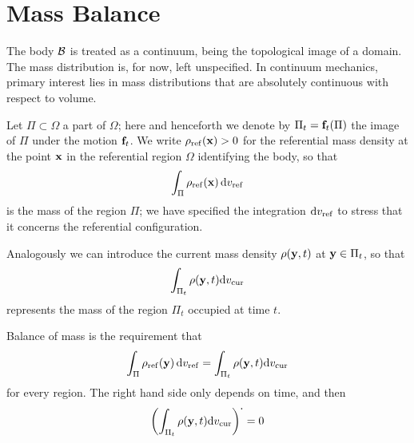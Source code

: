 \chapter{Mass Balance}

The body $\mathcal{B}$ is treated as a continuum, being the topological image of a domain. The mass distribution is, for now, left unspecified. In continuum mechanics, primary interest lies in mass distributions that are absolutely continuous with respect to volume.

Let $\Pi\subset\Omega$ a part of $\Omega$; here and henceforth we denote by $\Pi_t=\mathbf{f}_t(\Pi)$ the image of $\Pi$ under the motion $\mathbf{f}_t$. We write $\rho_{\rm ref}(\mathbf{x})>0$ for the referential mass density at the  point $\mathbf{x}$  in the referential region $\Omega$ identifying the body, so that
\begin{equation}
	\int_{\Pi}\rho_{\rm ref}(\mathbf{x})\,\mathrm{d} v_{\rm ref}
\end{equation}
is the mass of the region $\Pi$; we have specified the integration $\mathrm{d} v_{\rm ref}$ to stress that it concerns the referential configuration.

Analogously we can introduce the current mass density $\rho(\mathbf{y},t)$ at $\mathbf{y}\in\Pi_t$, so that
\begin{equation}
	\int_{\Pi_t}\rho(\mathbf{y},t)\mathrm{d} v_{\rm cur}
\end{equation}
represents the mass of the region $\Pi_t$ occupied at time $t$. 

Balance of mass is the requirement that
\begin{equation}
	\int_{\Pi}\rho_{\rm ref}(\mathbf{y})\,\mathrm{d} v_{\rm ref}=\int_{\Pi_t}\rho(\mathbf{y},t)\mathrm{d} v_{\rm cur}
\end{equation}
for every region. The right hand side only depends on time, and then
\begin{equation}\label{bm}
	\left( \int_{\Pi_t}  \rho(\mathbf{y},t)\mathrm{d} v_{\rm cur}\right)^{\operatorname{{\boldsymbol{\cdot}}}}=0
\end{equation}

